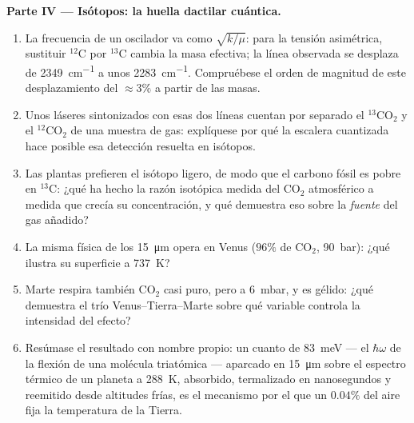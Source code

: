 \begin{problem}
\medskip\noindent\textbf{Parte IV --- Isótopos: la huella dactilar
cuántica.}
\begin{enumerate}[resume]
  \item La frecuencia de un oscilador va como $\sqrt{k/\mu}$: para la
        tensión asimétrica, sustituir $^{12}$C por $^{13}$C cambia la
        masa efectiva; la línea observada se desplaza de
        \qty{2349}{cm^{-1}} a unos \qty{2283}{cm^{-1}}. Compruébese el
        orden de magnitud de este desplazamiento del $\approx 3\%$ a
        partir de las masas.
  \item Unos láseres sintonizados con esas dos líneas cuentan por
        separado el $^{13}$CO$_2$ y el $^{12}$CO$_2$ de una muestra de
        gas: explíquese por qué la escalera cuantizada hace posible esa
        detección resuelta en isótopos.
  \item Las plantas prefieren el isótopo ligero, de modo que el carbono
        fósil es pobre en $^{13}$C: ¿qué ha hecho la razón isotópica
        medida del CO$_2$ atmosférico a medida que crecía su
        concentración, y qué demuestra eso sobre la \emph{fuente} del gas
        añadido?
  \item La misma física de los \qty{15}{\micro m} opera en Venus
        ($96\%$ de CO$_2$, \qty{90}{bar}): ¿qué ilustra su superficie a
        \qty{737}{K}?
  \item Marte respira también CO$_2$ casi puro, pero a \qty{6}{mbar},
        y es gélido: ¿qué demuestra el trío Venus--Tierra--Marte sobre
        qué variable controla la intensidad del efecto?
  \item Resúmase el resultado con nombre propio: un cuanto de
        \qty{83}{meV} --- el $\hbar\omega$ de la flexión de una molécula
        triatómica --- aparcado en \qty{15}{\micro m} sobre el espectro
        térmico de un planeta a \qty{288}{K}, absorbido, termalizado en
        nanosegundos y reemitido desde altitudes frías, es el mecanismo
        por el que un $0.04\%$ del aire fija la temperatura de la Tierra.
\end{enumerate}
\end{problem}
